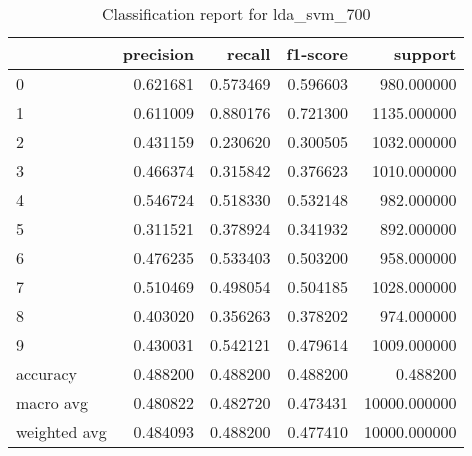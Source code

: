 \begin{table}[htb!]
\centering
\caption{Classification report for lda_svm_700}
\label{tab:classification-report-lda_svm_700}
\begin{tabular}{lrrrr}
\toprule
 & precision & recall & f1-score & support \\
\midrule
0 & 0.621681 & 0.573469 & 0.596603 & 980.000000 \\
1 & 0.611009 & 0.880176 & 0.721300 & 1135.000000 \\
2 & 0.431159 & 0.230620 & 0.300505 & 1032.000000 \\
3 & 0.466374 & 0.315842 & 0.376623 & 1010.000000 \\
4 & 0.546724 & 0.518330 & 0.532148 & 982.000000 \\
5 & 0.311521 & 0.378924 & 0.341932 & 892.000000 \\
6 & 0.476235 & 0.533403 & 0.503200 & 958.000000 \\
7 & 0.510469 & 0.498054 & 0.504185 & 1028.000000 \\
8 & 0.403020 & 0.356263 & 0.378202 & 974.000000 \\
9 & 0.430031 & 0.542121 & 0.479614 & 1009.000000 \\
accuracy & 0.488200 & 0.488200 & 0.488200 & 0.488200 \\
macro avg & 0.480822 & 0.482720 & 0.473431 & 10000.000000 \\
weighted avg & 0.484093 & 0.488200 & 0.477410 & 10000.000000 \\
\bottomrule
\end{tabular}
\end{table}

